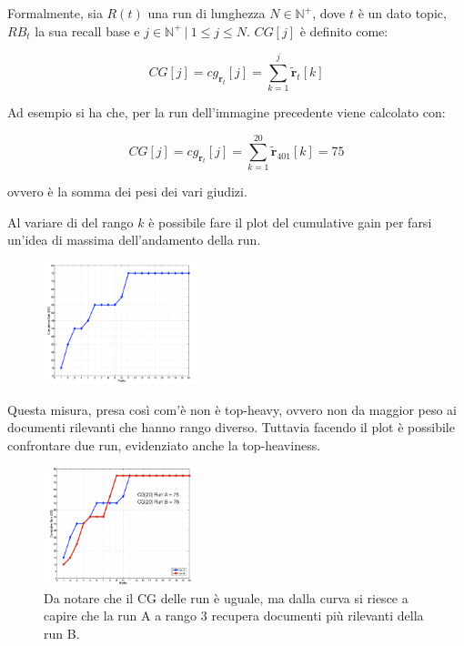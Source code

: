 \noindent Formalmente, sia $R(t)$ una run di lunghezza $N \in \mathbb{N}^+$, dove $t$ è un dato topic, $RB_t$ la sua recall base e $j \in \mathbb{N}^+ \ |\ 1 \leq j \leq N$. $CG[j]$ è definito come:

$$
CG[j] = cg_{\mathbf{r}_t}[j] = \sum\limits_{k=1}^j \tilde{\mathbf{r}}_t[k]
$$

\noindent Ad esempio si ha che, per la run dell'immagine precedente viene calcolato con:

$$
CG[j] = cg_{\mathbf{r}_t}[j] = \sum\limits_{k=1}^{20} \tilde{\mathbf{r}}_{401}[k] = 75
$$

\noindent ovvero è la somma dei pesi dei vari giudizi.

Al variare di del rango $k$ è possibile fare il plot del cumulative gain per farsi un'idea di massima dell'andamento della run.

\begin{figure}
	\centering
	\includegraphics[width=0.4\textwidth]{images/l16-fig-2.png}
\end{figure}

Questa misura, presa così com'è non è top-heavy, ovvero non da maggior peso ai documenti rilevanti che hanno rango diverso. Tuttavia facendo il plot è possibile confrontare due run, evidenziato anche la top-heaviness.

\begin{figure}
	\centering
	\includegraphics[width=0.4\textwidth]{images/l16-fig-3.png}
	\caption{Da notare che il CG delle run è uguale, ma dalla curva si riesce a capire che la run A a rango 3 recupera documenti più rilevanti della run B.}
\end{figure}

